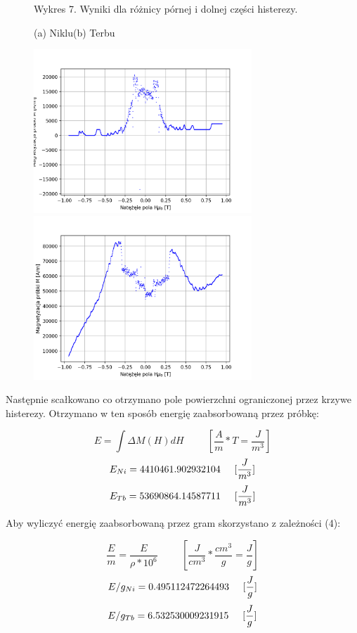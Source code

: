 \documentclass[a4paper]{article}
\begin{document}
\begin{figure}[H]
    \centering
    Wykres 7. Wyniki dla różnicy pórnej i dolnej części histerezy.
    \vspace{0.6cm}
    
    (a) Niklu\hspace{7cm}(b) Terbu
    
    \includegraphics[width=8.2cm]{Ni_E.png}
    \includegraphics[width=8.2cm]{Tb_E.png}
    \label{fig:my_label}
\end{figure}

Następnie scałkowano co otrzymano pole powierzchni ograniczonej przez krzywe histerezy. Otrzymano w ten sposób energię zaabsorbowaną przez próbkę:

\begin{equation}
    E = \int{\Delta M(H)}dH\hspace{1cm} [\frac{A}{m}*T = \frac{J}{m^3}]
\end{equation}
$$E_{Ni} = 4410461.902932104\hspace{0,5cm} [\frac{J}{m^3}]$$
$$E_{Tb} = 53690864.14587711\hspace{0,5cm} [\frac{J}{m^3}]$$

Aby wyliczyć energię zaabsorbowaną przez gram skorzystano z zależności (4):

\begin{equation}
    \frac{E}{m} = \frac{E}{\rho * 10^6}\hspace{1cm} [\frac{J}{cm^3}*\frac{cm^3}{g} = \frac{J}{g} ]
\end{equation}
$$E/g_{Ni} =0.495112472264493\hspace{0,5cm} [\frac{J}{g} ]$$
$$E/g_{Tb} = 6.532530009231915\hspace{0,5cm} [\frac{J}{g} ]$$
\end{document}
